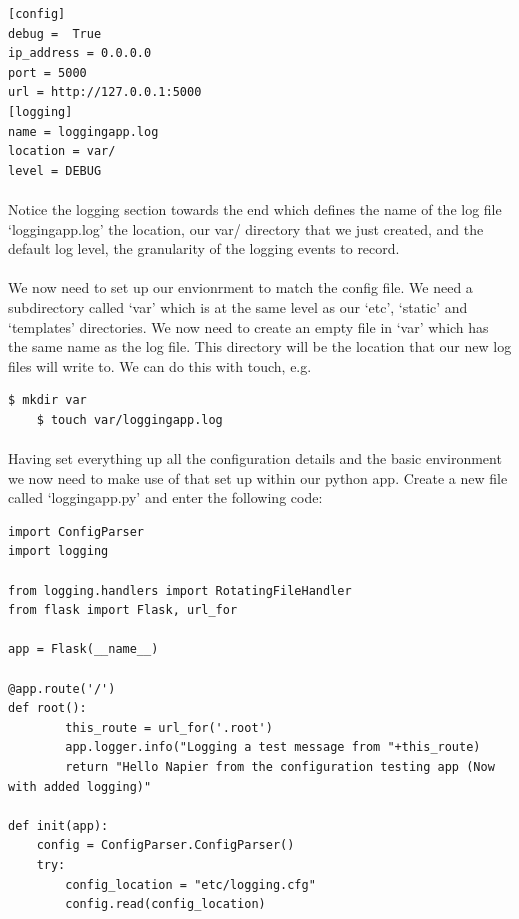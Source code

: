 \documentclass[12pt, a4paper, oneside]{book}
\begin{document}
{\begin{lstlisting}
[config]
debug =  True
ip_address = 0.0.0.0
port = 5000
url = http://127.0.0.1:5000
[logging]
name = loggingapp.log
location = var/
level = DEBUG
\end{lstlisting}
\paragraph{} Notice the logging section towards the end which defines the name of the log file `loggingapp.log' the location, our var/ directory that we just created, and the default log level, the granularity of the logging events to record. 
\paragraph{} We now need to set up our envionrment to match the config file. We need a subdirectory called `var' which is at the same level as our `etc', `static' and `templates' directories. We now need to create an empty file in `var' which has the same name as the log file. This directory will be the location that our new log files will write to. We can do this with touch, e.g.

\begin{lstlisting}[style=DOS]
    $ mkdir var
    $ touch var/loggingapp.log
\end{lstlisting}

\paragraph{} Having set everything up all the configuration details and the basic environment we now need to make use of that set up within our python app. Create a new file called `loggingapp.py' and enter the following code:
\begin{lstlisting}
import ConfigParser
import logging

from logging.handlers import RotatingFileHandler
from flask import Flask, url_for

app = Flask(__name__)

@app.route('/')
def root():
        this_route = url_for('.root')
        app.logger.info("Logging a test message from "+this_route)
        return "Hello Napier from the configuration testing app (Now with added logging)" 

def init(app):
    config = ConfigParser.ConfigParser()
    try:
        config_location = "etc/logging.cfg"
        config.read(config_location)
        

\end{lstlisting}}
\end{document}
